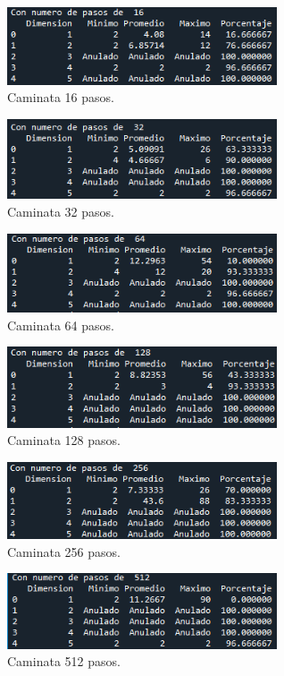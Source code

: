 \documentclass{article}
\begin{document}
\begin{figure}[H]
\centering
\includegraphics[width=80mm]{tabla_pasos16.png}
\caption{\label{fig1}Caminata 16 pasos.}
\end{figure}
\begin{figure}[H]
\centering
\includegraphics[width=80mm]{tabla_pasos32.png}
\caption{\label{fig1}Caminata 32 pasos.}
\end{figure}
\begin{figure}[H]
\centering
\includegraphics[width=80mm]{tabla_pasos64.png}
\caption{\label{fig1}Caminata 64 pasos.}
\end{figure}
\begin{figure}[H]
\centering
\includegraphics[width=80mm]{tabla_pasos128.png}
\caption{\label{fig1}Caminata 128 pasos.}
\end{figure}
\begin{figure}[H]
\centering
\includegraphics[width=80mm]{tabla_pasos256.png}
\caption{\label{fig1}Caminata 256 pasos.}
\end{figure}
\begin{figure}[H]
\centering
\includegraphics[width=80mm]{tabla_pasos512.png}
\caption{\label{fig1}Caminata 512 pasos.}
\end{figure}
\end{document}
